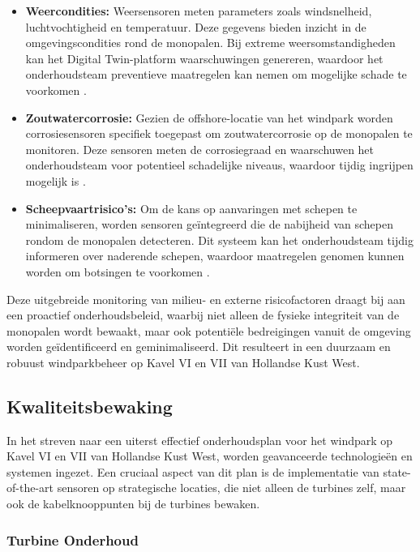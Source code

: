 \begin{itemize}
    \item \textbf{Weercondities:} Weersensoren meten parameters zoals windsnelheid, luchtvochtigheid en temperatuur. Deze gegevens bieden inzicht in de omgevingscondities rond de monopalen. Bij extreme weersomstandigheden kan het Digital Twin-platform waarschuwingen genereren, waardoor het onderhoudsteam preventieve maatregelen kan nemen om mogelijke schade te voorkomen \cite{9738001}.
    \item \textbf{Zoutwatercorrosie:} Gezien de offshore-locatie van het windpark worden corrosiesensoren specifiek toegepast om zoutwatercorrosie op de monopalen te monitoren. Deze sensoren meten de corrosiegraad en waarschuwen het onderhoudsteam voor potentieel schadelijke niveaus, waardoor tijdig ingrijpen mogelijk is \cite{9738001}.
    \item \textbf{Scheepvaartrisico's:} Om de kans op aanvaringen met schepen te minimaliseren, worden sensoren geïntegreerd die de nabijheid van schepen rondom de monopalen detecteren. Dit systeem kan het onderhoudsteam tijdig informeren over naderende schepen, waardoor maatregelen genomen kunnen worden om botsingen te voorkomen \cite{9738001}.
\end{itemize}

Deze uitgebreide monitoring van milieu- en externe risicofactoren draagt bij aan een proactief onderhoudsbeleid, waarbij niet alleen de fysieke integriteit van de monopalen wordt bewaakt, maar ook potentiële bedreigingen vanuit de omgeving worden geïdentificeerd en geminimaliseerd. Dit resulteert in een duurzaam en robuust windparkbeheer op Kavel VI en VII van Hollandse Kust West.

\subsection{Kwaliteitsbewaking}

In het streven naar een uiterst effectief onderhoudsplan voor het windpark op Kavel VI en VII van Hollandse Kust West, worden geavanceerde technologieën en systemen ingezet. Een cruciaal aspect van dit plan is de implementatie van state-of-the-art sensoren op strategische locaties, die niet alleen de turbines zelf, maar ook de kabelknooppunten bij de turbines bewaken.

\subsubsection{Turbine Onderhoud}

